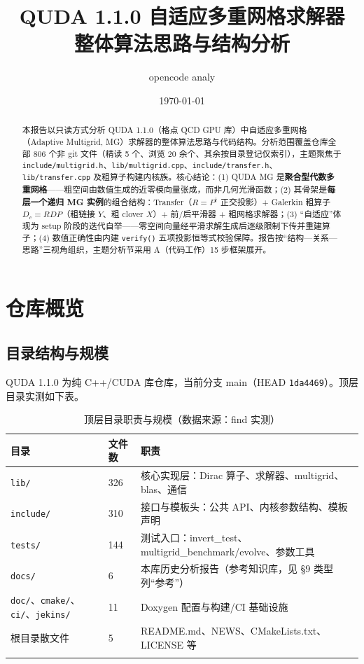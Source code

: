 \documentclass[UTF8]{ctexart}
\title{QUDA 1.1.0 自适应多重网格求解器\\整体算法思路与结构分析}
\author{opencode analy}
\date{\today}
\begin{document}
\maketitle

\begin{abstract}
本报告以只读方式分析 QUDA 1.1.0（格点 QCD GPU 库）中自适应多重网格（Adaptive Multigrid, MG）求解器的整体算法思路与代码结构。分析范围覆盖仓库全部 806 个非 git 文件（精读 5 个、浏览 20 余个、其余按目录登记仅索引），主题聚焦于 \texttt{\nolinkurl{include/multigrid.h}}、\texttt{\nolinkurl{lib/multigrid.cpp}}、\texttt{\nolinkurl{include/transfer.h}}、\texttt{\nolinkurl{lib/transfer.cpp}} 及粗算子构建内核族。核心结论：(1) QUDA MG 是\textbf{聚合型代数多重网格}——粗空间由数值生成的近零模向量张成，而非几何光滑函数；(2) 其骨架是\textbf{每层一个递归 MG 实例}的组合结构：Transfer（$R=P^\dagger$ 正交投影）+ Galerkin 粗算子 $D_c=RDP$（粗链接 $Y$、粗 clover $X$）+ 前/后平滑器 + 粗网格求解器；(3) ``自适应''体现为 setup 阶段的迭代自举——零空间向量经平滑求解生成后逐级限制下传并重建算子；(4) 数值正确性由内建 \texttt{verify()} 五项投影恒等式校验保障。报告按``结构—关系—思路''三视角组织，主题分析节采用 A（代码工作）15 步框架展开。
\end{abstract}

\tableofcontents

\section{仓库概览}

\subsection{目录结构与规模}

QUDA 1.1.0 为纯 C++/CUDA 库仓库，当前分支 main（HEAD \texttt{1da4469}）。顶层目录实测如下表。

\begin{xltabular}{\textwidth}{llX}
\toprule
\textcolor{struct}{目录} & 文件数 & \textcolor{struct}{职责} \\
\midrule
\endhead
\texttt{\nolinkurl{lib/}} & 326 & 核心实现层：Dirac 算子、求解器、multigrid、blas、通信 \\
\texttt{\nolinkurl{include/}} & 310 & 接口与模板头：公共 API、内核参数结构、模板声明 \\
\texttt{\nolinkurl{tests/}} & 144 & 测试入口：invert\_test、multigrid\_benchmark/evolve、参数工具 \\
\texttt{\nolinkurl{docs/}} & 6 & 本库历史分析报告（参考知识库，见 \S9 类型列``参考''） \\
\texttt{\nolinkurl{doc/}}、\texttt{\nolinkurl{cmake/}}、\texttt{\nolinkurl{ci/}}、\texttt{\nolinkurl{jekins/}} & 11 & Doxygen 配置与构建/CI 基础设施 \\
根目录散文件 & 5 & README.md、NEWS、CMakeLists.txt、LICENSE 等 \\
\bottomrule
\caption{顶层目录职责与规模（数据来源：find 实测）}
\end{xltabular}
\end{document}
